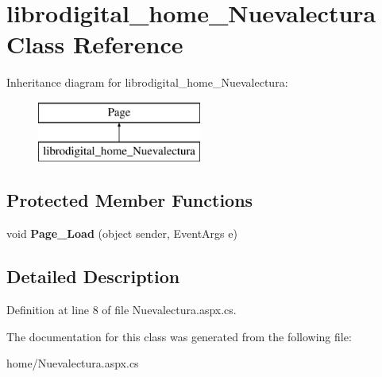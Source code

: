 \hypertarget{classlibrodigital__home___nuevalectura}{}\section{librodigital\+\_\+home\+\_\+\+Nuevalectura Class Reference}
\label{classlibrodigital__home___nuevalectura}
Inheritance diagram for librodigital\+\_\+home\+\_\+\+Nuevalectura\+:\begin{figure}[H]
\begin{center}
\leavevmode
\includegraphics[height=2.000000cm]{classlibrodigital__home___nuevalectura}
\end{center}
\end{figure}
\subsection*{Protected Member Functions}
\begin{DoxyCompactItemize}
\item 
void {\bfseries Page\+\_\+\+Load} (object sender, Event\+Args e)\hypertarget{classlibrodigital__home___nuevalectura_a257b3be2eafff8690bbeff19432f9241}{}\label{classlibrodigital__home___nuevalectura_a257b3be2eafff8690bbeff19432f9241}

\end{DoxyCompactItemize}


\subsection{Detailed Description}


Definition at line 8 of file Nuevalectura.\+aspx.\+cs.



The documentation for this class was generated from the following file\+:\begin{DoxyCompactItemize}
\item 
home/Nuevalectura.\+aspx.\+cs\end{DoxyCompactItemize}

